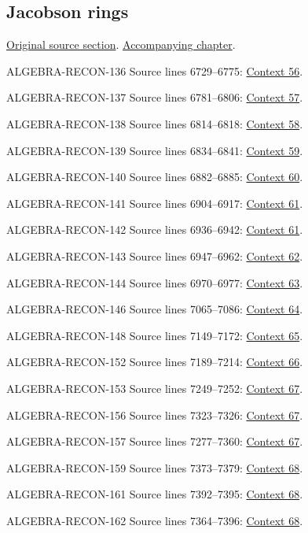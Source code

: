 \subsection{Jacobson rings}
\hypertarget{algebra-source-section-ring-jacobson}{}
\noindent\href{https://github.com/stacks/stacks-project/blob/a04446e57ec1fbc252a871afcec7752fb2807b14/algebra.tex\#L6649}{Original source section}. \href{algebra.pdf\#nameddest=section-ring-jacobson}{Accompanying chapter}.

\begin{AlgebraSourceRoutes}
\item[ALGEBRA-RECON-136] Source lines 6729--6775: \hyperlink{algebra-context-056}{Context 56}.
\item[ALGEBRA-RECON-137] Source lines 6781--6806: \hyperlink{algebra-context-057}{Context 57}.
\item[ALGEBRA-RECON-138] Source lines 6814--6818: \hyperlink{algebra-context-058}{Context 58}.
\item[ALGEBRA-RECON-139] Source lines 6834--6841: \hyperlink{algebra-context-059}{Context 59}.
\item[ALGEBRA-RECON-140] Source lines 6882--6885: \hyperlink{algebra-context-060}{Context 60}.
\item[ALGEBRA-RECON-141] Source lines 6904--6917: \hyperlink{algebra-context-061}{Context 61}.
\item[ALGEBRA-RECON-142] Source lines 6936--6942: \hyperlink{algebra-context-061}{Context 61}.
\item[ALGEBRA-RECON-143] Source lines 6947--6962: \hyperlink{algebra-context-062}{Context 62}.
\item[ALGEBRA-RECON-144] Source lines 6970--6977: \hyperlink{algebra-context-063}{Context 63}.
\item[ALGEBRA-RECON-146] Source lines 7065--7086: \hyperlink{algebra-context-064}{Context 64}.
\item[ALGEBRA-RECON-148] Source lines 7149--7172: \hyperlink{algebra-context-065}{Context 65}.
\item[ALGEBRA-RECON-152] Source lines 7189--7214: \hyperlink{algebra-context-066}{Context 66}.
\item[ALGEBRA-RECON-153] Source lines 7249--7252: \hyperlink{algebra-context-067}{Context 67}.
\item[ALGEBRA-RECON-156] Source lines 7323--7326: \hyperlink{algebra-context-067}{Context 67}.
\item[ALGEBRA-RECON-157] Source lines 7277--7360: \hyperlink{algebra-context-067}{Context 67}.
\item[ALGEBRA-RECON-159] Source lines 7373--7379: \hyperlink{algebra-context-068}{Context 68}.
\item[ALGEBRA-RECON-161] Source lines 7392--7395: \hyperlink{algebra-context-068}{Context 68}.
\item[ALGEBRA-RECON-162] Source lines 7364--7396: \hyperlink{algebra-context-068}{Context 68}.
\end{AlgebraSourceRoutes}

